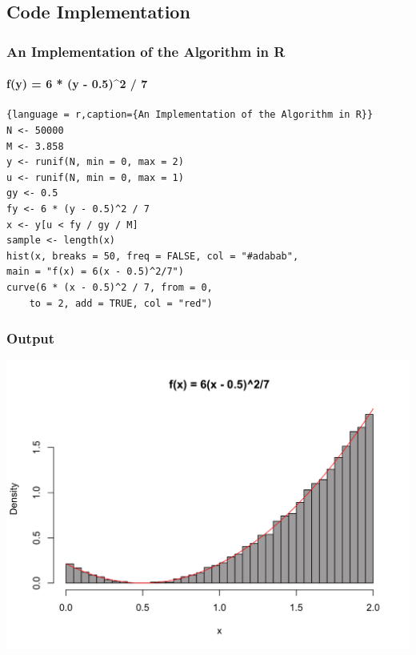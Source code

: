 \subsection{Code Implementation}
\begin{frame}[fragile]
    \frametitle{{An Implementation of the Algorithm in R}}
    \framesubtitle<overlay specification>{f(y) = 6 * (y - 0.5)^2 / 7}
        \begin{lstlisting}{language = r,caption={An Implementation of the Algorithm in R}}
N <- 50000
M <- 3.858
y <- runif(N, min = 0, max = 2)
u <- runif(N, min = 0, max = 1)
gy <- 0.5
fy <- 6 * (y - 0.5)^2 / 7
x <- y[u < fy / gy / M]
sample <- length(x)
hist(x, breaks = 50, freq = FALSE, col = "#adabab",
main = "f(x) = 6(x - 0.5)^2/7")
curve(6 * (x - 0.5)^2 / 7, from = 0, 
    to = 2, add = TRUE, col = "red")
    \end{lstlisting}


\end{frame}

\begin{frame}
    \frametitle{Output}

    \begin{center}
        \includegraphics[width = .9\linewidth]{image2.png}
    \end{center}

\end{frame}


